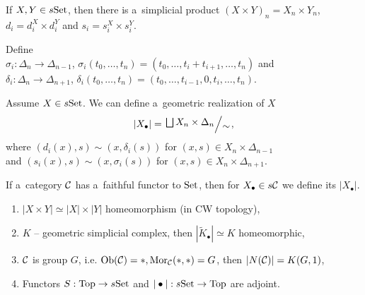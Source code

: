     \begin{remark}
        If $X, Y \in s\mathrm{Set}$, then there is a~simplicial product
        $(X \times Y)_n = X_n \times Y_n$,
        $d_i = d_i^X \times d_i^Y$
        and $s_i = s_i^X \times s_i^Y$.
    \end{remark}
    
    \begin{definition}
        Define \\$\sigma_i:\Delta_n \to \Delta_{n-1}$,
        $\sigma_i(t_0,\ldots, t_n) = {(t_0,\ldots,t_i+t_{i+1},\ldots, t_n)}$
        and \\ $\delta_i:\Delta_n \to \Delta_{n+1}$,
        $\delta_i(t_0, \ldots, t_n) = (t_0, \ldots, t_{i-1},0,t_i,\ldots,t_n)$.
        
        Assume $X \in s\mathrm{Set}$. We can define a~geometric realization of $X$
        $$|X_\bullet| = \bigslant{\bigsqcup X_n \times \Delta_n}{\sim},$$
        where $(d_i(x),s) \sim (x,\delta_i(s))$ 
        for $(x,s) \in X_n \times \Delta_{n-1}$
        \\and $(s_i(x),s) \sim (x,\sigma_i(s))$
        for $(x,s) \in X_n \times \Delta_{n+1}$.
    \end{definition}
    
    \begin{remark}
        If a~category $\mathcal{C}$ has a~faithful functor to $\mathrm{Set}$,
        then for $X_\bullet \in s\mathcal{C}$ we define its $|X_\bullet|$.
    \end{remark}
    
    \begin{theorem}
        \begin{enumerate}
            \item $|X \times Y| \simeq |X|\times|Y|$ homeomorphism
            (in CW topology),
            \item $K$ -- geometric simplicial complex, then 
            $|\tilde{K}_\bullet| \simeq K$ homeomorphic,
            \item $\mathcal{C}$ is group $G$, 
            i.e. $\operatorname{Ob}(\mathcal{C}) = \ast, \operatorname{Mor}_{\mathcal{C}}(\ast,\ast) = G$,
            then $|N(\mathcal{C})| = K(G,1)$,
            \item Functors $S:\mathrm{Top}\to s\mathrm{Set}$ 
            and $|\bullet|:s\mathrm{Set} \to\mathrm{Top}$ are adjoint.
        \end{enumerate}
    \end{theorem}


 
 